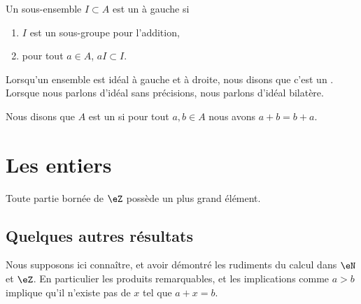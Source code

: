 \begin{definition}  \label{DefooQULAooREUIU}
    Un sous-ensemble \( I\subset A\) est un  à gauche si
    \begin{enumerate}
        \item
            \( I\) est un sous-groupe pour l'addition,
        \item
            pour tout \( a\in A\), \( aI\subset I\).
    \end{enumerate}

    Lorsqu'un ensemble est idéal à gauche et à droite, nous disons que c'est un . Lorsque nous parlons d'idéal sans précisions, nous parlons d'idéal bilatère.
\end{definition}

\begin{definition}
    Nous disons que \( A\) est un  si pour tout \( a,b\in A\) nous avons \( a+b=b+a\).
\end{definition}

\section{Les entiers}

\begin{lemma}       \label{LEMooMYEIooNFwNVI}
    Toute partie bornée de \( \eZ\) possède un plus grand élément.
\end{lemma}

\subsection{Quelques autres résultats}

Nous supposons ici connaître, et avoir démontré les rudiments du calcul dans \( \eN\) et \( \eZ\). En particulier les produits remarquables, et les implications comme \( a>b\) implique qu'il n'existe pas de \( x\) tel que \( a+x=b\).

